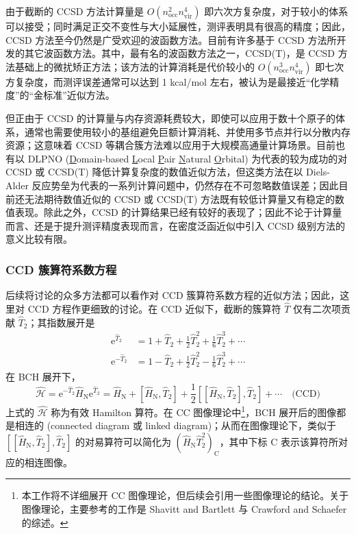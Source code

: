 由于截断的 CCSD 方法计算量是 $O(n_\mathrm{occ}^2 n_\mathrm{vir}^4)$ 即六次方复杂度，对于较小的体系可以接受；同时满足正交不变性与大小延展性，测评表明具有很高的精度；因此，CCSD 方法至今仍然是广受欢迎的波函数方法。目前有许多基于 CCSD 方法所开发的其它波函数方法。其中，最有名的波函数方法之一，CCSD(T)，是 CCSD 方法基础上的微扰矫正方法\cite{Raghavachari-Head-Gordon.CPL.1989}；该方法的计算消耗是代价较小的 $O(n_\mathrm{occ}^3 n_\mathrm{vir}^4)$ 即七次方复杂度，而测评误差通常可以达到 1 kcal/mol 左右，被认为是最接近“化学精度”的“金标准”近似方法。

但正由于 CCSD 的计算量与内存资源耗费较大，即使可以应用于数十个原子的体系，通常也需要使用较小的基组避免巨额计算消耗、并使用多节点并行以分散内存资源\cite{Shen-Scheffler.JCTC.2019}；这意味着 CCSD 等耦合簇方法难以应用于大规模高通量计算场景。目前也有以 DLPNO (\underline{D}omain-based \underline{L}ocal \underline{P}air \underline{N}atural \underline{O}rbital) 为代表的较为成功的对 CCSD 或 CCSD(T) 降低计算复杂度的数值近似方法\cite{Riplinger-Neese.JCP.2013, Riplinger-Neese.JCP.2013a, Guo-Neese.JCP.2018}，但这类方法在以 Diels-Alder 反应势垒为代表的一系列计算问题中，仍然存在不可忽略数值误差\cite{Sandler-Ho.JPCA.2021}；因此目前还无法期待数值近似的 CCSD 或 CCSD(T) 方法既有较低计算量又有稳定的数值表现。除此之外，CCSD 的计算结果已经有较好的表现了；因此不论于计算量而言、还是于提升测评精度表现而言，在密度泛函近似中引入 CCSD 级别方法的意义比较有限。

\subsubsection{CCD 簇算符系数方程}

后续将讨论的众多方法都可以看作对 CCD 簇算符系数方程的近似方法；因此，这里对 CCD 方程作更细致的讨论。在 CCD 近似下，截断的簇算符 $\hat T$ 仅有二次项贡献 $\hat T_2$；其指数展开是
\begin{align*}
  \mathrm{e}^{\hat T_2} &= 1 + \hat T_2 + \frac{1}{2} \hat T_2^2 + \frac{1}{6} \hat T_2^3 + \cdots \\
  \mathrm{e}^{- \hat T_2} &= 1 - \hat T_2 + \frac{1}{2} \hat T_2^2 - \frac{1}{6} \hat T_2^3 + \cdots
\end{align*}
在 BCH 展开下，
\begin{equation}
  \hat{\mathcal{H}} = \mathrm{e}^{-\hat T_2} \hat H_\mathrm{N} \mathrm{e}^{\hat T_2} = \hat H_\mathrm{N} + [\hat H_\mathrm{N}, \hat T_2] + \frac{1}{2} [[\hat H_\mathrm{N}, \hat T_2], \hat T_2] + \cdots \quad \text{(CCD)}
\end{equation}
上式的 $\hat{\mathcal{H}}$ 称为有效 Hamilton 算符。在 CC 图像理论中\footnote{本工作将不详细展开 CC 图像理论，但后续会引用一些图像理论的结论。关于图像理论，主要参考的工作是 Shavitt and Bartlett\cite{Shavitt-Bartlett.Cambridge.2009} 与 Crawford and Schaefer\cite{Crawford-Schaefer.RCC.2007} 的综述。}，BCH 展开后的图像都是相连的 (connected diagram 或 linked diagram)；从而在图像理论下，类似于 $[[\hat H_\mathrm{N}, \hat T_2], \hat T_2]$ 的对易算符可以简化为 $(\hat H_\mathrm{N} \hat T_2^2)_\mathrm{C}$，其中下标 $\mathrm{C}$ 表示该算符所对应的相连图像。


